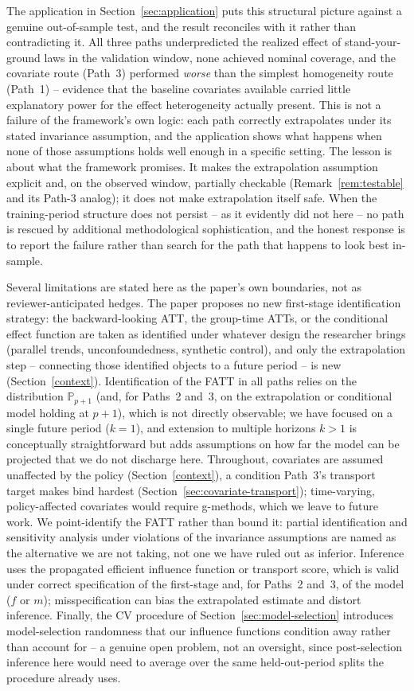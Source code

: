\documentclass{article}
\renewcommand{\P}{\mathbb{P}}
\begin{document}
The application in Section~\ref{sec:application} puts this structural picture against a genuine out-of-sample test, and the result reconciles with it rather than contradicting it. All three paths underpredicted the realized effect of stand-your-ground laws in the validation window, none achieved nominal coverage, and the covariate route (Path~3) performed \emph{worse} than the simplest homogeneity route (Path~1) -- evidence that the baseline covariates available carried little explanatory power for the effect heterogeneity actually present. This is not a failure of the framework's own logic: each path correctly extrapolates under its stated invariance assumption, and the application shows what happens when none of those assumptions holds well enough in a specific setting. The lesson is about what the framework promises. It makes the extrapolation assumption explicit and, on the observed window, partially checkable (Remark~\ref{rem:testable} and its Path-3 analog); it does not make extrapolation itself safe. When the training-period structure does not persist -- as it evidently did not here -- no path is rescued by additional methodological sophistication, and the honest response is to report the failure rather than search for the path that happens to look best in-sample.

Several limitations are stated here as the paper's own boundaries, not as reviewer-anticipated hedges. The paper proposes no new first-stage identification strategy: the backward-looking ATT, the group-time ATTs, or the conditional effect function are taken as identified under whatever design the researcher brings (parallel trends, unconfoundedness, synthetic control), and only the extrapolation step -- connecting those identified objects to a future period -- is new (Section~\ref{context}). Identification of the FATT in all paths relies on the distribution $\P_{p+1}$ (and, for Paths~2 and~3, on the extrapolation or conditional model holding at $p+1$), which is not directly observable; we have focused on a single future period ($k=1$), and extension to multiple horizons $k>1$ is conceptually straightforward but adds assumptions on how far the model can be projected that we do not discharge here. Throughout, covariates are assumed unaffected by the policy (Section~\ref{context}), a condition Path~3's transport target makes bind hardest (Section~\ref{sec:covariate-transport}); time-varying, policy-affected covariates would require g-methods, which we leave to future work. We point-identify the FATT rather than bound it: partial identification and sensitivity analysis under violations of the invariance assumptions are named as the alternative we are not taking, not one we have ruled out as inferior. Inference uses the propagated efficient influence function or transport score, which is valid under correct specification of the first-stage and, for Paths~2 and~3, of the model ($f$ or $m$); misspecification can bias the extrapolated estimate and distort inference. Finally, the CV procedure of Section~\ref{sec:model-selection} introduces model-selection randomness that our influence functions condition away rather than account for -- a genuine open problem, not an oversight, since post-selection inference here would need to average over the same held-out-period splits the procedure already uses.
\end{document}

